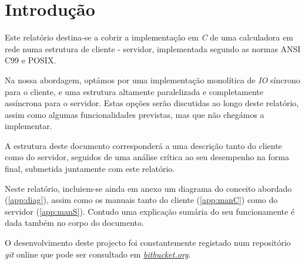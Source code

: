 \section{Introdução\label{sec:Introducao}}

	\indent\indent Este relatório destina-se a cobrir a implementação em \emph{C} de uma calculadora em rede numa estrutura de cliente - servidor, implementada segundo as normas ANSI C99 e POSIX.

	Na nossa abordagem, optámos por uma implementação monolítica de \emph{IO} síncrono para o cliente, e uma estrutura altamente paralelizada e completamente assíncrona para o servidor.
	Estas opções serão discutidas ao longo deste relatório, assim como algumas funcionalidades previstas, mas que não chegámos a implementar.

	A estrutura deste documento corresponderá a uma descrição tanto do cliente como do servidor, seguidos de uma análise crítica ao seu desempenho na forma final, submetida juntamente com este relatório.

	Neste relatório, incluiem-se ainda em anexo um diagrama do conceito abordado (\ref{app:diag}), assim como os manuais tanto do cliente (\ref{app:manC}) como do servidor (\ref{app:manS}).
	Contudo uma explicação sumária do seu funcionamente é dada também no corpo do documento.

	O desenvolvimento deste projecto foi constantemente registado num repositório \emph{git} online que pode ser consultado em \href{https://bitbucket.org/BrunoMSantos/yasc/overview}{\emph{bitbucket.org}}.

\clearpage